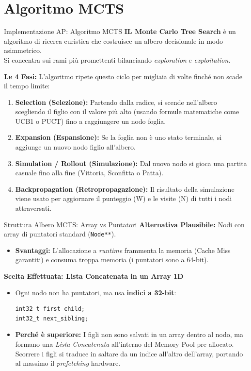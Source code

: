\documentclass[10pt]{beamer}
\begin{document}
\section{Algoritmo MCTS}
\begin{frame}{Implementazione AP: Algoritmo MCTS}
    \textbf{IL Monte Carlo Tree Search}
    è un algoritmo di ricerca euristica che costruisce un albero decisionale in modo asimmetrico. \\ Si concentra sui rami più promettenti bilanciando \textit{exploration} e \textit{exploitation}.
    
    \vspace{0.2cm}
    \textbf{Le 4 Fasi:}
    L'algoritmo ripete questo ciclo per migliaia di volte finché non scade il tempo limite:
    \begin{enumerate}
        \item \textbf{Selection (Selezione):} Partendo dalla radice, si scende nell'albero scegliendo il figlio con il valore più alto (usando formule matematiche come UCB1 o PUCT) fino a raggiungere un nodo foglia.
        \item \textbf{Expansion (Espansione):} Se la foglia non è uno stato terminale, si aggiunge un nuovo nodo figlio all'albero.
        \item \textbf{Simulation / Rollout (Simulazione):} Dal nuovo nodo si gioca una partita casuale fino alla fine (Vittoria, Sconfitta o Patta).
        \item \textbf{Backpropagation (Retropropagazione):} Il risultato della simulazione viene usato per aggiornare il punteggio (W) e le visite (N) di tutti i nodi attraversati.
    \end{enumerate}
\end{frame}
\begin{frame}[fragile]{Struttura Albero MCTS: Array vs Puntatori}
    \textbf{Alternativa Plausibile:} Nodi con array di puntatori standard (\texttt{Node**}).
    \begin{itemize}
        \item \textbf{Svantaggi:} L'allocazione a \textit{runtime} frammenta la memoria (Cache Miss garantiti) e consuma troppa memoria (i puntatori sono a 64-bit).
    \end{itemize}
    
    \vspace{0.1cm}
    \textbf{Scelta Effettuata: Lista Concatenata in un Array 1D}
    \begin{itemize}
        \item Ogni nodo non ha puntatori, ma usa \textbf{indici a 32-bit}:
\begin{lstlisting}[language=C, basicstyle=\ttfamily\footnotesize, keywordstyle=\color{blue}]
int32_t first_child;
int32_t next_sibling;
\end{lstlisting}
        \item \textbf{Perché è superiore:} I figli non sono salvati in un array dentro al nodo, ma formano una \textit{Lista Concatenata} all'interno del Memory Pool pre-allocato. Scorrere i figli si traduce in saltare da un indice all'altro dell'array, portando al massimo il \textit{prefetching} hardware.
    \end{itemize}
\end{frame}
\end{document}
